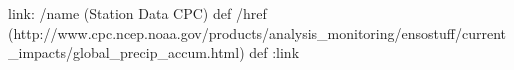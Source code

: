 
link:
/name (Station Data CPC) def
/href (http://www.cpc.ncep.noaa.gov/products/analysis_monitoring/ensostuff/current_impacts/global_precip_accum.html) def
:link
\begin{ingrid}
\end{ingrid}
